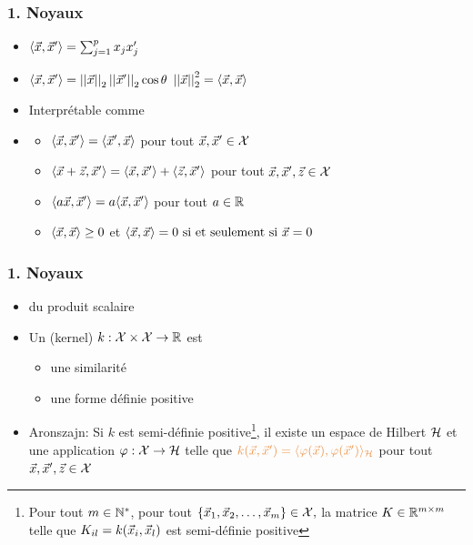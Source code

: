 \begin{frame}
  \frametitle{1. Noyaux}
  \begin{itemize}
  \item $\langle \vec{x}, \vec{x}^\prime \rangle = \sum_{j=1}^p x_j x_j^\prime$
  \item $\langle \vec{x}, \vec{x}^\prime \rangle = \left|\left|\vec{x}\right|\right|_2 \left|\left|\vec{x}^\prime\right|\right|_2 \cos \theta$ \hspace{1em}
     $\left|\left|\vec{x}\right|\right|_2^2 = \langle \vec{x}, \vec{x} \rangle$
  \item Interprétable comme 
  \item {}
    \begin{itemize}
    \item $\langle \vec{x}, \vec{x}^\prime \rangle = \langle \vec{x}^\prime, \vec{x} \rangle$
      pour tout $\vec{x}, \vec{x}^\prime \in \mathcal{X}$
    \item $\langle \vec{x} + \vec{z}, \vec{x}^\prime \rangle = \langle \vec{x}, \vec{x}^\prime \rangle +
      \langle \vec{z}, \vec{x}^\prime \rangle$       pour tout $\vec{x}, \vec{x}^\prime, \vec{z} \in \mathcal{X}$
    \item $\langle a \vec{x}, \vec{x}^\prime \rangle = a \langle \vec{x}, \vec{x}^\prime \rangle$ pour tout $a \in {\mathbb R}$
    \item $\langle \vec{x}, \vec{x} \rangle \geq 0$ et $\langle \vec{x}, \vec{x} \rangle = 0 \text{ si et seulement si } \vec{x} = 0$
    \end{itemize}
  \end{itemize}
\end{frame}

\begin{frame}
  \frametitle{1. Noyaux}
  \begin{itemize}
  \item {} du produit scalaire 
  \item Un  \textcolor{gray!70}{(kernel)} $k: \mathcal{X} \times \mathcal{X} \rightarrow {\mathbb R}$ est 
    \begin{itemize}
    \item {} une similarité
    \item {} une forme définie positive 
    \end{itemize}
  \item Aronszajn: Si $k$ est semi-définie positive\footnote{Pour tout
      $m \in {\mathbb N}^*$, pour tout
      $\{\vec{x}_1, \vec{x}_2, \dots, \vec{x}_m\} \in \mathcal{X},$ la matrice
      $K \in {\mathbb R}^{m \times m}$ telle que $K_{il} = k(\vec{x}_i, \vec{x}_l)$ est
      semi-définie positive}, il existe un espace de Hilbert $\mathcal{H}$ et une application
    $\varphi: \mathcal{X} \rightarrow \mathcal{H}$ telle que
    $\textcolor{MyOrange}{k(\xvec, \xvec^\prime) = \langle \varphi(\xvec), \varphi(\xvec^\prime)\rangle_{\hcal}}$
    pour tout $\vec{x}, \vec{x}^\prime, \vec{z} \in \mathcal{X}$
  \end{itemize}
\end{frame}

